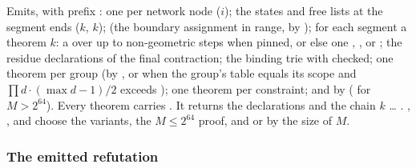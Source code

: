{{{\begin{algorithm}\label{alg:lean-export-sym-decls}
Emits, with prefix : one  per network node ($i$); the states and free lists at the segment ends ($k$, $k$);  (the boundary assignment in range, by ); for each segment a theorem $k$: a  over up to  non-geometric steps when pinned, or else one , , or ; the residue declarations of the final contraction; the binding trie  with  checked; one  theorem per group (by , or  when the group's table equals its scope and $\prod d\cdot(\max d-1)/2$ exceeds ); one  theorem per constraint; and  by  ( for $M>2^{64}$). Every theorem carries . It returns the declarations and the chain   $k$ \ldots{} . , , and  choose the  variants, the $M\le 2^{64}$ proof, and  or  by the size of $M$.
\end{algorithm}

\subsubsection{The emitted refutation}\label{sec:lean-export-refute-source}

}}}
